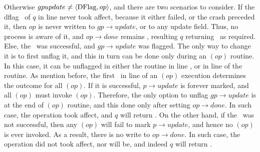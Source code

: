 Otherwise $gpupdate \neq \langle \mbox{DFlag}, op \rangle$, and there are two scenarios to consider. If the dflag \CASB\ of $q$ in line  never took affect, because it either failed, or the crash preceded it, then $op$ is never written to $gp\rightarrow update$, or to any update field. Thus, no process is aware of it, and $op\rightarrow done$ remains \FALSE, resulting $q$ returning \FAIL\ as required. Else, the \CASB\ was successful, and $gp\rightarrow update$ was flagged. The only way to change it is to first unflag it, and this in turn can be done only during an $(op)$ routine. In this case, it can be unflagged in either the  routine in line , or in line  of the  routine. As mention before, the first \CASB\ in line  of an $(op)$ execution determines the outcome for all $(op)$. If it is successful, $p\rightarrow update$ is forever marked, and all $(op)$ must invoke $(op)$. Therefore, the only option to unflag $gp\rightarrow update$ is at the end of $(op)$ routine, and this done only after setting $op\rightarrow done$. In such case, the  operation took affect, and $q$ will return \TRUE. On the other hand, if the \CASB\ was not successful, then any $(op)$ will fail to mark $p\rightarrow update$, and hence no $(op)$ is ever invoked. As a result, there is no write to $op\rightarrow done$. In such case, the  operation did not took affect, nor will be, and indeed $q$ will return \FAIL.





